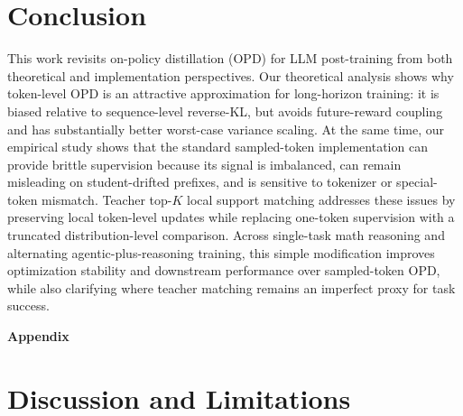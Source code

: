 \documentclass{article}
\begin{document}
\section{Conclusion}
\label{sec:conclusion}

This work revisits on-policy distillation (OPD) for LLM post-training from both theoretical and implementation perspectives.
Our theoretical analysis shows why token-level OPD is an attractive approximation for long-horizon training: it is biased relative to sequence-level reverse-KL, but avoids future-reward coupling and has substantially better worst-case variance scaling.
At the same time, our empirical study shows that the standard sampled-token implementation can provide brittle supervision because its signal is imbalanced, can remain misleading on student-drifted prefixes, and is sensitive to tokenizer or special-token mismatch.
Teacher top-$K$ local support matching addresses these issues by preserving local token-level updates while replacing one-token supervision with a truncated distribution-level comparison.
Across single-task math reasoning and alternating agentic-plus-reasoning training, this simple modification improves optimization stability and downstream performance over sampled-token OPD, while also clarifying where teacher matching remains an imperfect proxy for task success.

\newpage



\newpage
\appendix

\renewcommand{\thefigure}{A\arabic{figure}}
\renewcommand{\thetable}{A\arabic{table}}

\setcounter{figure}{0}
\setcounter{table}{0}

\renewcommand{\theequation}{A\arabic{equation}}
\setcounter{equation}{0}

\textbf{\LARGE{Appendix}}
\vspace{5pt}

\section{Discussion and Limitations}
\label{app:limitations}
\end{document}
